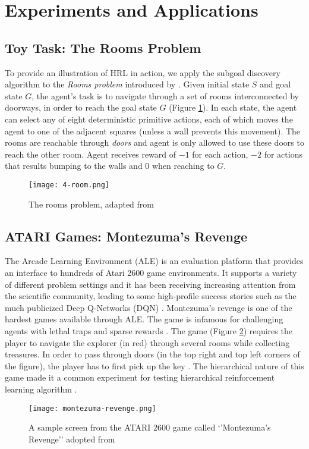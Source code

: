 \documentclass[letterpaper,titlepage]{article}
\begin{document}
\section{Experiments and Applications}

\subsection{Toy Task: The Rooms Problem}
To provide an illustration of HRL in action, we apply the subgoal discovery algorithm to the \emph{Rooms problem} introduced by \citep{RL-Book:Sutton:1998}. Given initial state $S$ and goal state $G$, the agent's task is to navigate through a set of rooms interconnected by doorways, in order to reach the goal state $G$ (Figure \ref{g:4-room}). In each state, the agent can select any of eight deterministic primitive actions, each of which moves the agent to one of the adjacent squares (unless a wall prevents this movement). The rooms are reachable through \emph{doors} and agent is only allowed to use these doors to reach the other room. Agent receives reward of $-1$ for each action, $-2$ for actions that results bumping to the walls and $0$ when reaching to $G$. 
\begin{figure}[H]
\centering
\texttt{[image: 4-room.png]}
\caption{The rooms problem, adapted from \citep{HRL-BOTVINICK:2009}}
\label{g:4-room}
\end{figure}

\subsection{ATARI Games: Montezuma's Revenge}
The Arcade Learning Environment (ALE) is an evaluation platform that provides an interface to hundreds of Atari 2600 game environments. It supports a variety of different problem settings and it has been receiving increasing attention from the scientific community, leading to some high-profile success stories such as the much publicized Deep Q-Networks (DQN) \citep{DeepMind-ATARI-2013,ALE:Bellemare:2013}. Montezuma's revenge is one of the hardest games available through ALE. The game is infamous for challenging agents with lethal traps and sparse rewards \citep{FeUdal:HRL:Sahsa:2017}. The game (Figure \ref{g:montezuma-revenge}) requires the player to navigate the explorer (in red) through several rooms while collecting treasures. In order to pass through doors (in the top right and top left corners of the figure), the player has to first pick up the key \citep{HRL:MIT:Kulkarni:2016}. The hierarchical nature of this game made it a common experiment for testing hierarchical reinforcement learning algorithm \citep{HRL:MIT:Kulkarni:2016,FeUdal:HRL:Sahsa:2017}.
\begin{figure}[H]
\centering
\texttt{[image: montezuma-revenge.png]}
\caption{A sample screen from the ATARI 2600 game called `'Montezuma's Revenge'' adopted from \citep{HRL:MIT:Kulkarni:2016}}
\label{g:montezuma-revenge}
\end{figure}
\end{document}
